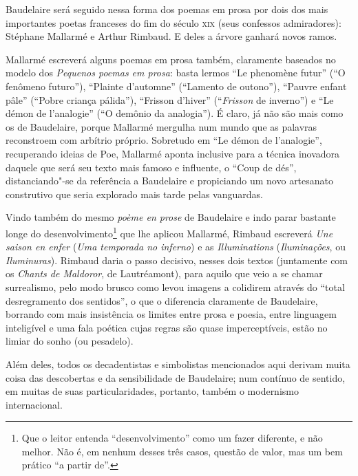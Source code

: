 Baudelaire será seguido nessa forma dos poemas em prosa por dois dos
mais importantes poetas franceses do fim do século \textsc{xix} (seus
confessos admiradores): Stéphane Mallarmé e Arthur Rimbaud. E deles a
árvore ganhará novos ramos.


Mallarmé escreverá alguns poemas em prosa também, claramente baseados no
modelo dos \textit{Pequenos poemas em prosa}: basta lermos “Le phenomène futur”
(“O fenômeno futuro”), “Plainte d’automne” (“Lamento de outono”), “Pauvre
enfant pâle” (“Pobre criança pálida”), “Frisson d’hiver”
(“\textit{Frisson} de inverno”) e “Le démon de l’analogie” (“O demônio da
analogia”). É claro, já não são mais como os de Baudelaire, porque
Mallarmé mergulha num mundo que as palavras reconstroem com arbítrio
próprio. Sobretudo em “Le démon de l’analogie”, recuperando ideias de
Poe, Mallarmé aponta inclusive para a técnica inovadora daquele que
será seu texto mais famoso e influente, o “Coup de dés”,
distanciando"-se da referência a Baudelaire e propiciando um novo
artesanato construtivo que seria explorado mais tarde pelas vanguardas.

Vindo também do mesmo \textit{poème en prose} de Baudelaire e indo parar
bastante longe do desenvolvimento\footnote{ Que o leitor entenda
“desenvolvimento” como um fazer diferente, e não melhor. Não é, em
nenhum desses três casos, questão de valor, mas um bem prático “a
partir de”.} que lhe aplicou Mallarmé, Rimbaud escreverá \textit{Une
saison en enfer} (\textit{Uma temporada no inferno}) e as \textit{Illuminations}
(\textit{Iluminações}, ou \textit{Iluminuras}). Rimbaud daria o passo decisivo, nesses
dois textos (juntamente com os \textit{Chants de Maldoror}, de
Lautréamont), para aquilo que veio a se chamar surrealismo, pelo modo
brusco como levou imagens a colidirem através do “total desregramento
dos sentidos”, o que o diferencia claramente de Baudelaire, borrando
com mais insistência os limites entre prosa e poesia, entre linguagem
inteligível e uma fala poética cujas regras são quase imperceptíveis,
estão no limiar do sonho (ou pesadelo).

Além deles, todos os decadentistas e simbolistas mencionados aqui
derivam muita coisa das descobertas e da sensibilidade de Baudelaire;
num contínuo de sentido, em muitas de suas particularidades, portanto,
também o modernismo internacional.

